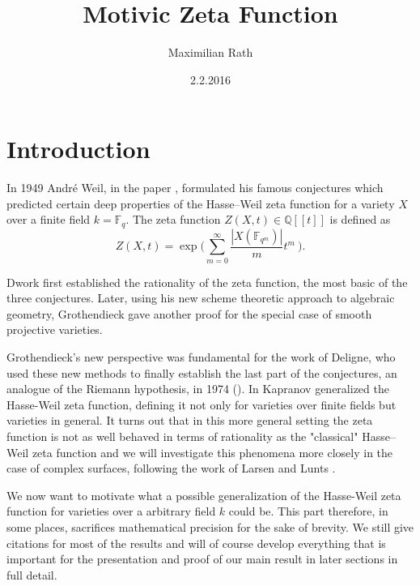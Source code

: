\documentclass[11pt, a4paper, german]{article}
\author{Maximilian Rath}
\date{2.2.2016}
\title{Motivic Zeta Function}
\theoremstyle{plain}
\newtheorem{theorem}{Theorem}[section]
\theoremstyle{definition}
\begin{document}
\maketitle
\section{Introduction}

In 1949 Andr\'e Weil, in the paper \cite{weil1949}, formulated his famous conjectures
which predicted certain deep properties of the Hasse--Weil zeta function for a variety $X$ over a finite field $k = \mathbb{F}_q$. 
The zeta function $Z(X,t) \in \mathbb{Q}[[t]]$ is defined as
\[
    Z(X,t) = \exp \big(\sum_{m=0}^\infty \frac{|X(\mathbb{F}_{q^m})|}{m} t^m \ \big).
\]

Dwork first established the rationality of the zeta function, the most basic of the three conjectures. 
Later, using his new scheme theoretic approach to algebraic geometry, Grothendieck gave another proof for the special case of 
smooth projective varieties.


Grothendieck's new perspective was fundamental for the work of Deligne, who used these new methods to finally establish the 
last part of the conjectures, an analogue of the Riemann hypothesis, in 1974 (\cite{MR0340258}).
In \cite{kapranov} Kapranov generalized the Hasse-Weil zeta function, defining it not only for varieties over finite fields
but varieties in general. It turns out that in this more general setting the zeta function is not as well behaved in terms of rationality as
the "classical" Hasse--Weil zeta function and we will investigate this phenomena more closely in the case of complex surfaces, following the 
work of Larsen and Lunts \cite{MR1996804}.

We now want to motivate what a possible generalization of the Hasse-Weil zeta function for varieties over a arbitrary field $k$ could be.
This part therefore, in some places, sacrifices mathematical precision for the sake of brevity.  
We still give citations for most of the results and will of course develop everything that is important for the presentation and proof 
of our main result in later sections in full detail.
\end{document}
